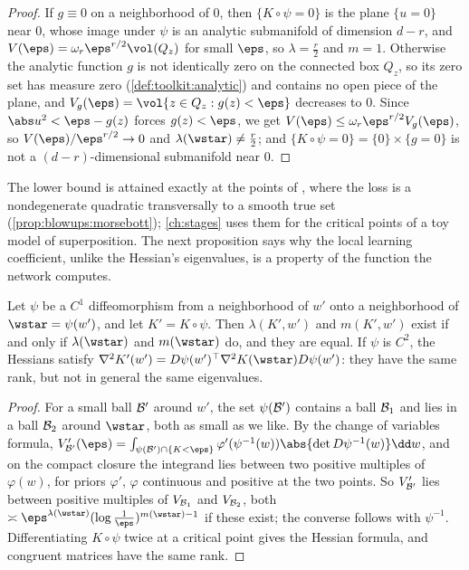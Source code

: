 \begin{refsection}
\begin{proof}
If $g\equiv0$ on a neighborhood of $0$, then $\{K\circ\psi=0\}$ is the plane $\{u=0\}$ near $0$, whose image under $\psi$ is an analytic submanifold of dimension $d-r$, and $V(\eps)=\omega_r\eps^{r/2}\vol(Q_z)$ for small $\eps$, so $\lambda=\tfrac r2$ and $m=1$. Otherwise the analytic function $g$ is not identically zero on the connected box $Q_z$, so its zero set has measure zero (\cref{def:toolkit:analytic}) and contains no open piece of the plane, and $V_g(\eps)=\vol\{z\in Q_z:g(z)<\eps\}$ decreases to $0$. Since $\abs u^2<\eps-g(z)$ forces $g(z)<\eps$, we get $V(\eps)\le\omega_r\eps^{r/2}V_g(\eps)$, so $V(\eps)/\eps^{r/2}\to0$ and $\lambda(\wstar)\ne\tfrac r2$; and $\{K\circ\psi=0\}=\{0\}\times\{g=0\}$ is not a $(d-r)$-dimensional submanifold near $0$.
\end{proof}

The lower bound is attained exactly at the  points of \textcite{WeiEtAl2023}, where the loss is a nondegenerate quadratic transversally to a smooth true set (\cref{prop:blowups:morsebott}); \cref{ch:stages} uses them for the critical points of a toy model of superposition. The next proposition says why the local learning coefficient, unlike the Hessian's eigenvalues, is a property of the function the network computes.

\begin{proposition}\label{prop:llc:invariance}
Let $\psi$ be a $C^1$ diffeomorphism from a neighborhood of $w'$ onto a neighborhood of $\wstar=\psi(w')$, and let $K'=K\circ\psi$. Then $\lambda(K',w')$ and $m(K',w')$ exist if and only if $\lambda(\wstar)$ and $m(\wstar)$ do, and they are equal. If $\psi$ is $C^2$, the Hessians satisfy $\nabla^2K'(w')=D\psi(w')^\top\nabla^2K(\wstar)D\psi(w')$: they have the same rank, but not in general the same eigenvalues.
\end{proposition}

\begin{proof}
For a small ball $\mathcal{B}'$ around $w'$, the set $\psi(\mathcal{B}')$ contains a ball $\mathcal{B}_1$ and lies in a ball $\mathcal{B}_2$ around $\wstar$, both as small as we like. By the change of variables formula, $V'_{\llcB'}(\eps)=\int_{\psi(\llcB')\cap\{K<\eps\}}\varphi'(\psi^{-1}(w))\abs{\det D\psi^{-1}(w)}\dd w$, and on the compact closure the integrand lies between two positive multiples of $\varphi(w)$, for priors $\varphi'$, $\varphi$ continuous and positive at the two points. So $V'_{\mathcal{B}'}$ lies between positive multiples of $V_{\mathcal{B}_1}$ and $V_{\mathcal{B}_2}$, both $\asymp\eps^{\lambda(\wstar)}(\log\frac1\eps)^{m(\wstar)-1}$ if these exist; the converse follows with $\psi^{-1}$. Differentiating $K\circ\psi$ twice at a critical point gives the Hessian formula, and congruent matrices have the same rank.
\end{proof}


\end{refsection}
